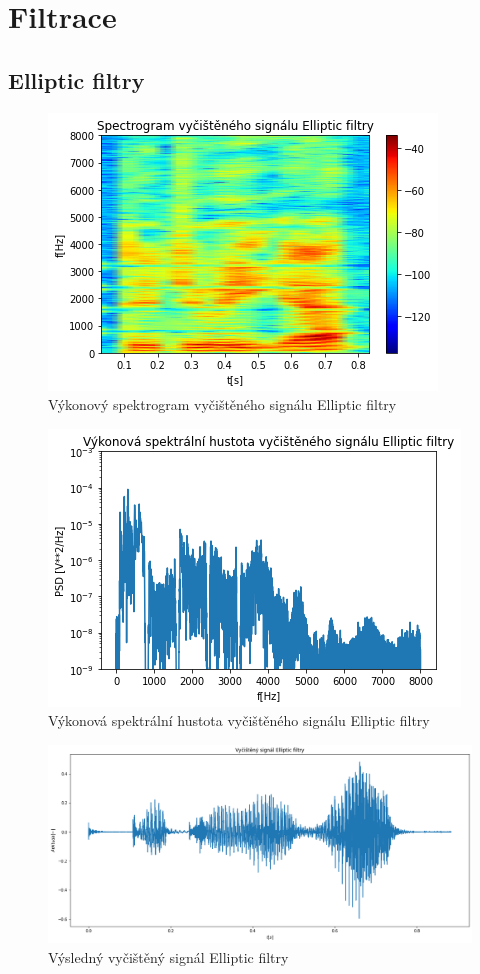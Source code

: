 \documentclass{article}
\begin{document}
\section{Filtrace}
\subsection{Elliptic filtry}
\begin{figure}[H] 
	\centering
	\includegraphics[scale=0.65,keepaspectratio]{Figure_20}
	\caption{Výkonový spektrogram vyčištěného signálu Elliptic filtry}
\end{figure}

\begin{figure}[H] 
	\centering
	\includegraphics[scale=0.65,keepaspectratio]{Figure_21}
	\caption{Výkonová spektrální hustota vyčištěného signálu Elliptic filtry}
\end{figure}

\begin{landscape}
\begin{figure}[H] 
	\centering
	\includegraphics[scale=0.55,keepaspectratio]{Figure_23}
	\caption{Výsledný vyčištěný signál Elliptic filtry}
\end{figure}
\end{landscape}
\end{document}

